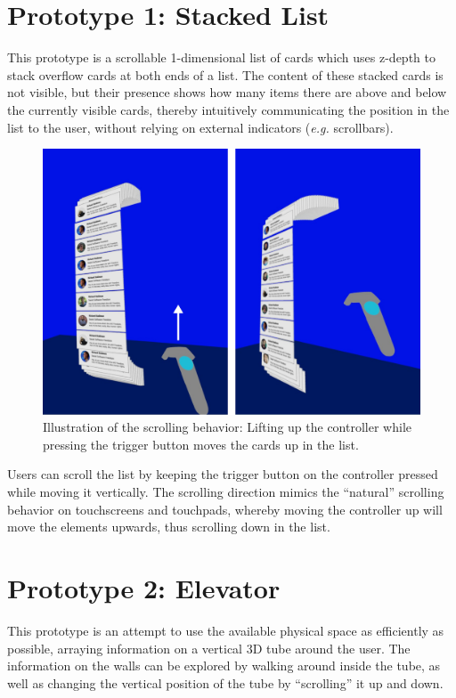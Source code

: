 \documentclass{tufte-book} %
\newcommand{\hairsp}{\hspace{1pt}} %
\newcommand{\eg}{\textit{e.\hairsp{}g.}\xspace} %
\begin{document}
\section{Prototype 1: Stacked List}
This prototype is a scrollable 1-dimensional list of cards which uses z-depth to stack overflow cards at both ends of a list. The content of these stacked cards is not visible, but their presence shows how many items there are above and below the currently visible cards, thereby intuitively communicating the position in the list to the user, without relying on external indicators (\eg scrollbars).

\begin{figure}
  \includegraphics{emailscroll.png}
  \caption{Illustration of the scrolling behavior: Lifting up the controller while pressing the trigger button moves the cards up in the list.}
  \label{fig:emailscroll}
\end{figure}

Users can scroll the list by keeping the trigger button on the controller pressed while moving it vertically. The scrolling direction mimics the ``natural'' scrolling behavior on touchscreens and touchpads, whereby moving the controller up will move the elements upwards, thus scrolling down in the list.


\section{Prototype 2: Elevator}
This prototype is an attempt to use the available physical space as efficiently as possible, arraying information on a vertical 3D tube around the user. The information on the walls can be explored by walking around inside the tube, as well as changing the vertical position of the tube by ``scrolling'' it up and down.
\end{document}
